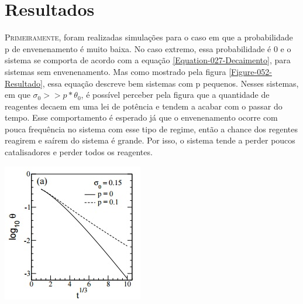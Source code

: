 
\section{Resultados}

\lettrine{P}{rimeiramente}, foram realizadas simulações para o caso em que a probabilidade p
de envenenamento é muito baixa. No caso extremo, essa probabilidade é 0 e o
sistema se comporta de acordo com a equação \ref{Equation-027-Decaimento}, para
sistemas sem envenenamento. Mas como mostrado pela figura
\ref{Figure-052-Resultado}, essa equação descreve bem sistemas com p pequenos.
Nesses sistemas, em que $\sigma_0 >> p*\theta_0$, é possível perceber pela
figura que a quantidade de reagentes decaem em uma lei de potência e tendem a
acabar com o passar do tempo. Esse comportamento é esperado já que o
envenenamento ocorre com pouca frequência no sistema com esse tipo de regime,
então a chance dos regentes reagirem e saírem do sistema é grande. Por isso, o
sistema tende a perder poucos catalisadores e perder todos os reagentes.

{
	\captionsetup{type=figure}
	\hfill \break
	\includegraphics[width=\columnwidth]{./figures/052-Resultado.jpg}
	\label{Figure-052-Resultado}
}

